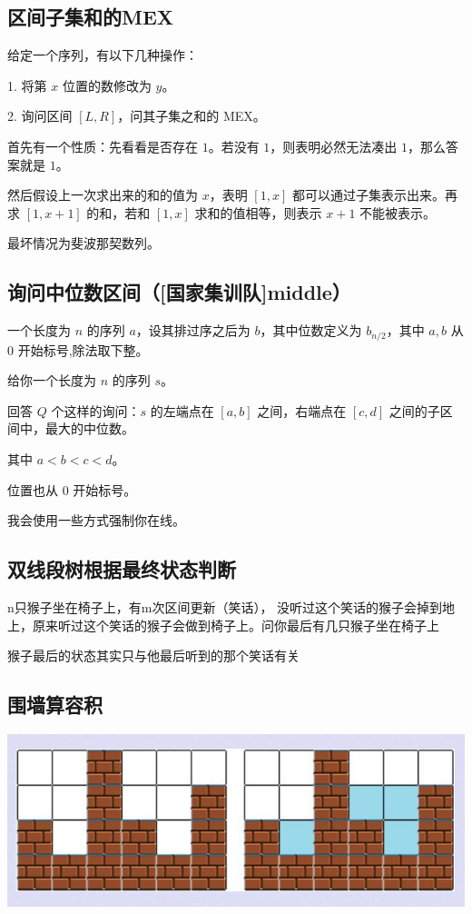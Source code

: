\documentclass[twoside,a4paper]{article}
\begin{document}
\subsection{区间子集和的MEX}
给定一个序列，有以下几种操作：\par
1. 将第 $x$ 位置的数修改为 $y$。\par
2. 询问区间 $[L, R]$，问其子集之和的 MEX。\par
首先有一个性质：先看看是否存在 $1$。若没有 $1$，则表明必然无法凑出 $1$，那么答案就是 $1$。\par
然后假设上一次求出来的和的值为 $x$，表明 $[1,x]$ 都可以通过子集表示出来。再求 $[1,x+1]$ 的和，若和 $[1,x]$ 求和的值相等，则表示 $x+1$ 不能被表示。\par
最坏情况为斐波那契数列。


\subsection{询问中位数区间（[国家集训队]middle）}
一个长度为 $n$ 的序列 $a$，设其排过序之后为 $b$，其中位数定义为 $b_{n/2}$，其中 $a,b$ 从 $0$ 开始标号,除法取下整。\par
给你一个长度为 $n$ 的序列 $s$。\par
回答 $Q$ 个这样的询问：$s$ 的左端点在 $[a,b]$ 之间，右端点在 $[c,d]$ 之间的子区间中，最大的中位数。\par
其中 $a<b<c<d$。\par
位置也从 $0$ 开始标号。\par
我会使用一些方式强制你在线。\par


\subsection{双线段树根据最终状态判断}
n只猴子坐在椅子上，有m次区间更新（笑话）， 没听过这个笑话的猴子会掉到地上，原来听过这个笑话的猴子会做到椅子上。问你最后有几只猴子坐在椅子上\par
猴子最后的状态其实只与他最后听到的那个笑话有关


\subsection{围墙算容积}
\includegraphics[width=15cm]{习题整理/围墙算容积.jpg}

\end{document}
